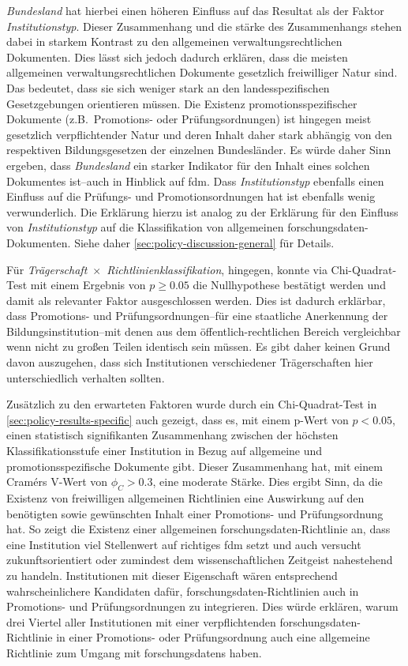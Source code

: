 \textit{Bundesland} hat hierbei einen höheren Einfluss auf das Resultat als der Faktor \textit{Institutionstyp}.
Dieser Zusammenhang und die stärke des Zusammenhangs stehen dabei in starkem Kontrast zu den allgemeinen verwaltungsrechtlichen Dokumenten.
Dies lässt sich jedoch dadurch erklären, dass die meisten allgemeinen verwaltungsrechtlichen Dokumente gesetzlich freiwilliger Natur sind.
Das bedeutet, dass sie sich weniger stark an den landesspezifischen Gesetzgebungen orientieren müssen.
Die Existenz promotionsspezifischer Dokumente (z.B.~Promotions- oder Prüfungsordnungen) ist hingegen meist gesetzlich verpflichtender Natur und deren Inhalt daher stark abhängig von den respektiven Bildungsgesetzen der einzelnen Bundesländer.
Es würde daher Sinn ergeben, dass \textit{Bundesland} ein starker Indikator für den Inhalt eines solchen Dokumentes ist--auch in Hinblick auf \gls{fdm}.
Dass \textit{Institutionstyp} ebenfalls einen Einfluss auf die Prüfungs- und Promotionsordnungen hat ist ebenfalls wenig verwunderlich.
Die Erklärung hierzu ist analog zu der Erklärung für den Einfluss von \textit{Institutionstyp} auf die Klassifikation von allgemeinen \gls{forschungsdaten}-Dokumenten.
Siehe daher \cref{sec:policy-discussion-general} für Details.

Für \textit{Trägerschaft}~$\times$~\textit{Richtlinienklassifikation}, hingegen, konnte via Chi-Quadrat-Test mit einem Ergebnis von $p\geqslant\num{0,05}$ die Nullhypothese bestätigt werden und damit als relevanter Faktor ausgeschlossen werden.
Dies ist dadurch erklärbar, dass Promotions- und Prüfungsordnungen--für eine staatliche Anerkennung der Bildungsinstitution--mit denen aus dem öffentlich-rechtlichen Bereich vergleichbar wenn nicht zu großen Teilen identisch sein müssen.
Es gibt daher keinen Grund davon auszugehen, dass sich Institutionen verschiedener Trägerschaften hier unterschiedlich verhalten sollten.

Zusätzlich zu den erwarteten Faktoren wurde durch ein Chi-Quadrat-Test in \cref{sec:policy-results-specific} auch gezeigt, dass es, mit einem p-Wert von $p<\num{0,05}$, einen statistisch signifikanten Zusammenhang zwischen der höchsten Klassifikationsstufe einer Institution in Bezug auf allgemeine und promotionsspezifische Dokumente gibt.
Dieser Zusammenhang hat, mit einem Cramérs V-Wert von $\phi_C>\num{0.3}$, eine moderate Stärke.
Dies ergibt Sinn, da die Existenz von freiwilligen allgemeinen Richtlinien eine Auswirkung auf den benötigten sowie gewünschten Inhalt einer Promotions- und Prüfungsordnung hat.
So zeigt die Existenz einer allgemeinen \gls{forschungsdaten}-Richtlinie an, dass eine Institution viel Stellenwert auf richtiges \gls{fdm} setzt und auch versucht zukunftsorientiert oder zumindest dem wissenschaftlichen Zeitgeist nahestehend zu handeln.
Institutionen mit dieser Eigenschaft wären entsprechend wahrscheinlichere Kandidaten dafür, \gls{forschungsdaten}-Richtlinien auch in Promotions- und Prüfungsordnungen zu integrieren.
Dies würde erklären, warum drei Viertel aller Institutionen mit einer verpflichtenden \gls{forschungsdaten}-Richtlinie in einer Promotions- oder Prüfungsordnung auch eine allgemeine Richtlinie zum Umgang mit \glspl{forschungsdaten} haben.